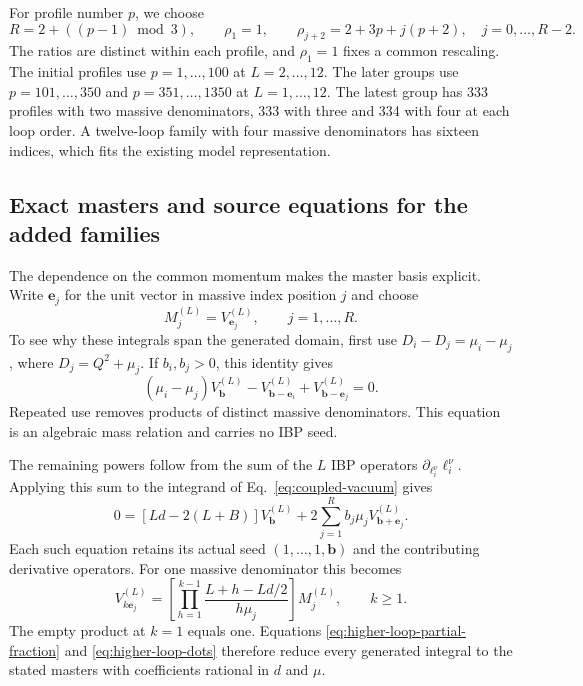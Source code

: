 For profile number $p$, we choose
\begin{equation}
 R=2+((p-1)\bmod3),\qquad
 \rho_1=1,\qquad
 \rho_{j+2}=2+3p+j(p+2),\quad j=0,\ldots,R-2 .
 \label{eq:higher-loop-masses}
\end{equation}
The ratios are distinct within each profile, and $\rho_1=1$ fixes a
common rescaling. The initial profiles use $p=1,\ldots,100$ at
$L=2,\ldots,12$. The later groups use $p=101,\ldots,350$
and $p=351,\ldots,1350$ at $L=1,\ldots,12$. The latest group
has 333 profiles with two massive denominators, 333 with three and
334 with four at each loop order.
A twelve-loop family with four massive denominators has sixteen
indices, which fits the existing model representation.

\subsection{Exact masters and source equations for the added families}
The dependence on the common momentum makes the master basis
explicit. Write $\boldsymbol e_j$ for the unit vector in massive
index position $j$ and choose
\begin{equation}
 M_j^{(L)}=V^{(L)}_{\boldsymbol e_j},
 \qquad j=1,\ldots,R .
 \label{eq:higher-loop-masters}
\end{equation}
To see why these integrals span the generated domain, first use
$D_i-D_j=\mu_i-\mu_j$, where $D_j=Q^2+\mu_j$. If $b_i,b_j>0$,
this identity gives
\begin{equation}
 (\mu_i-\mu_j)V^{(L)}_{\boldsymbol b}
 -V^{(L)}_{\boldsymbol b-\boldsymbol e_i}
 +V^{(L)}_{\boldsymbol b-\boldsymbol e_j}=0 .
 \label{eq:higher-loop-partial-fraction}
\end{equation}
Repeated use removes products of distinct massive denominators.
This equation is an algebraic mass relation and carries no IBP seed.

The remaining powers follow from the sum of the $L$ IBP operators
$\partial_{\ell_i^\nu}\ell_i^\nu$. Applying this sum to the integrand
of Eq.~\eqref{eq:coupled-vacuum} gives
\begin{equation}
 0=[Ld-2(L+B)]V^{(L)}_{\boldsymbol b}
   +2\sum_{j=1}^{R}b_j\mu_j
                 V^{(L)}_{\boldsymbol b+\boldsymbol e_j}.
 \label{eq:higher-loop-euler}
\end{equation}
Each such equation retains its actual seed
$(1,\ldots,1,\boldsymbol b)$ and the contributing derivative operators.
For one massive denominator this becomes
\begin{equation}
 V^{(L)}_{k\boldsymbol e_j}
 =\left[\prod_{h=1}^{k-1}
       \frac{L+h-Ld/2}{h\mu_j}\right]M_j^{(L)},
 \qquad k\geq1 .
 \label{eq:higher-loop-dots}
\end{equation}
The empty product at $k=1$ equals one. Equations
\eqref{eq:higher-loop-partial-fraction} and
\eqref{eq:higher-loop-dots} therefore reduce every generated integral
to the stated masters with coefficients rational in $d$ and $\mu$.

